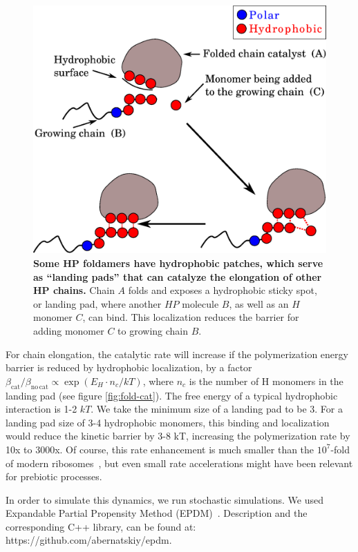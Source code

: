 \documentclass[twocolumn,letterpaper]{revtex4-1}
\begin{document}
   \begin{figure}[ht!]
  \centering
  \includegraphics[width=0.8\columnwidth]{pictures/hp-catalysis.eps} 
  \caption{\footnotesize{\textbf{Some HP foldamers have hydrophobic patches, which serve as 
``landing pads'' that can catalyze the elongation of other HP chains.}  Chain $A$ folds and 
exposes a hydrophobic sticky spot, or landing pad, where another $HP$ molecule $B$, as well as an 
$H$ monomer 
$C$, can bind.  This localization reduces the barrier for adding monomer $C$ to growing chain 
$B$.}}
  \label{fig:hp-catalysis}
\end{figure} 

 For chain elongation, the catalytic rate will increase if the polymerization energy barrier is 
reduced by hydrophobic localization, by a factor $\beta_\mathrm{cat}/ \beta_\mathrm{no\,cat} 
\propto \exp(E_{H}\cdot n_{c}/kT)$, where $n_c$ is the number of H monomers in the landing pad 
(see 
figure \ref{fig:fold-cat}).  The free energy of a typical hydrophobic interaction 
is 1-2 $kT$.  We take the minimum size of a landing pad to be 3.  For a landing pad size of 3-4 
hydrophobic monomers, this binding and localization would reduce the kinetic barrier by 3-8 kT, 
increasing the polymerization rate by 10x to 3000x.  Of course, this rate enhancement is much 
smaller than the $10^7$-fold of modern ribosomes~\cite{Sievers2004a}, but even small rate 
accelerations might have been relevant for prebiotic processes.

In order to simulate this dynamics, we run stochastic simulations. 
We used Expandable Partial Propensity Method (EPDM)~\cite{Guseva2016b}. Description and the 
corresponding C++ library, can be found at: 
https://github.com/abernatskiy/epdm. 
  
\end{document}
